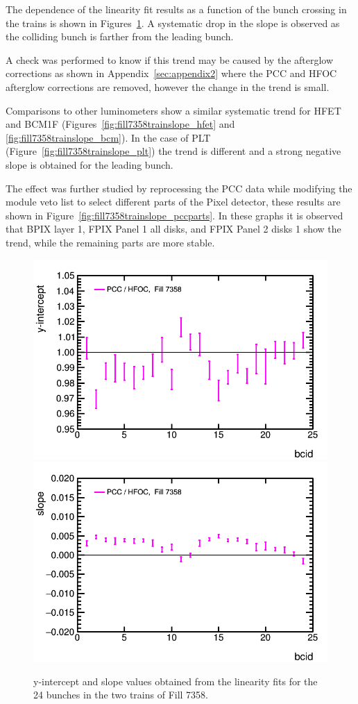 The dependence of the linearity fit results as a function of  the bunch crossing in the trains is shown in Figures~\ref{fig:fill7358trainresults}.
A systematic drop in the slope is observed as the colliding bunch is farther from the leading bunch.

A check was performed to know if this trend may be caused by the afterglow corrections  as shown in Appendix~\ref{sec:appendix2} where the PCC and HFOC afterglow corrections are removed, however the change in the trend is small.

Comparisons to other luminometers show a similar systematic trend for HFET and BCM1F (Figures~\ref{fig:fill7358trainslope_hfet} and \ref{fig:fill7358trainslope_bcm}).
In the case of PLT (Figure~\ref{fig:fill7358trainslope_plt}) the trend is different and a strong negative slope is obtained for the leading bunch.

The effect was further studied by reprocessing the PCC data while modifying the module veto list to select different parts of the Pixel detector, these results are shown in Figure~\ref{fig:fill7358trainslope_pccparts}.
In these graphs it is observed that BPIX layer 1, FPIX Panel 1 all disks, and FPIX Panel 2 disks 1 show the trend, while the remaining parts are more stable.

\begin{figure}[t]
  \begin{center}
    \includegraphics[width=0.47\linewidth]{plots/sbilratios_trains_Fill7358/plot_det_linearity_perbx_y0_7358.png}
    \includegraphics[width=0.47\linewidth]{plots/sbilratios_trains_Fill7358/plot_det_linearity_perbx_slope_7358.png}
    \caption{
      y-intercept and slope values obtained from the linearity fits for the 24 bunches in the two trains of Fill 7358.
      \label{fig:fill7358trainresults}
    }
  \end{center}
\end{figure}



